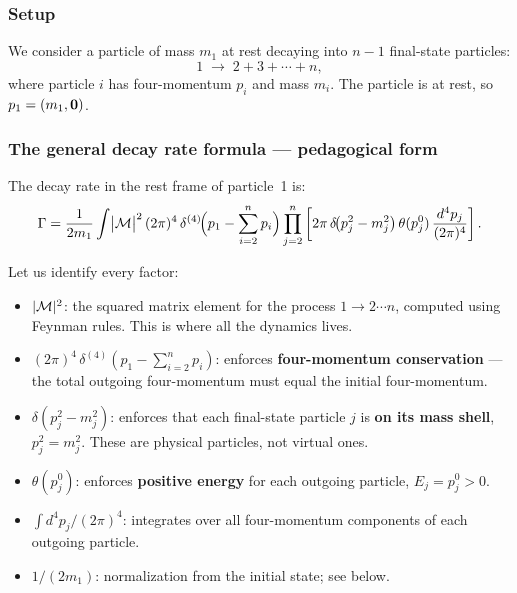 \documentclass[../main.tex]{subfiles}
\begin{document}
\subsubsection*{Setup}

We consider a particle of mass $m_1$ at rest decaying into $n-1$ final-state particles:
\begin{equation}
  1 \;\to\; 2 + 3 + \cdots + n,
  \label{eq:lec06:decay-setup}
\end{equation}
where particle $i$ has four-momentum $p_i$ and mass $m_i$.  The particle is at rest, so $p_1 = (m_1, \mathbf{0})$.

\subsubsection*{The general decay rate formula — pedagogical form}

The decay rate in the rest frame of particle~1 is:
\begin{equation}
  \Gamma
  = \frac{1}{2m_1}
    \int \bigl|\mathcal{M}\bigr|^2\,
    (2\pi)^4\,\delta^{(4)}\!\Bigl(p_1 - \sum_{i=2}^{n} p_i\Bigr)
    \prod_{j=2}^{n}
    \left[
      2\pi\,\delta\!\bigl(p_j^2 - m_j^2\bigr)\,
      \theta(p_j^0)\,
      \frac{d^4p_j}{(2\pi)^4}
    \right].
  \label{eq:lec06:decay-rate-raw}
\end{equation}

Let us identify every factor:
\begin{itemize}
  \item $|\mathcal{M}|^2$: the squared matrix element for the process $1 \to 2\cdots n$, computed using Feynman rules.  This is where all the dynamics lives.
  \item $(2\pi)^4\,\delta^{(4)}(p_1 - \sum_{i=2}^n p_i)$: enforces \textbf{four-momentum conservation} — the total outgoing four-momentum must equal the initial four-momentum.
  \item $\delta(p_j^2 - m_j^2)$: enforces that each final-state particle $j$ is \textbf{on its mass shell}, $p_j^2 = m_j^2$.  These are physical particles, not virtual ones.
  \item $\theta(p_j^0)$: enforces \textbf{positive energy} for each outgoing particle, $E_j = p_j^0 > 0$.
  \item $\int d^4p_j/(2\pi)^4$: integrates over all four-momentum components of each outgoing particle.
  \item $1/(2m_1)$: normalization from the initial state; see below.
\end{itemize}
\end{document}
